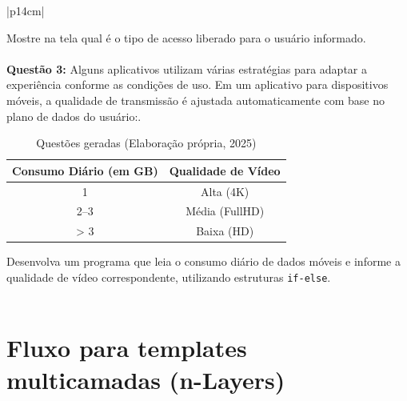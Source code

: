 \begin{table}[H]
\begin{tabular}{|p{14cm}|}
\begin{minipage}{\linewidth}
    \end{minipage}

        \vspace{1em}

        Mostre na tela qual é o tipo de acesso liberado para o usuário informado.\\[1em]
        \\
        \textbf{Questão 3:} Alguns aplicativos utilizam várias estratégias para adaptar a experiência conforme as condições de uso. Em um aplicativo para dispositivos móveis, a qualidade de transmissão é ajustada automaticamente com base no plano de dados do usuário:.
        \vspace{1em}
        
    
        
        \begin{minipage}{\linewidth}
        \centering
        \begin{tabular}{|c|c|}
                \hline
                \textbf{Consumo Diário (em GB)} & \textbf{Qualidade de Vídeo} \\
                \hline
                1 & Alta (4K) \\
                \hline
                2--3 & Média (FullHD) \\
                \hline
                > 3 & Baixa (HD) \\
                \hline
        \end{tabular}

    \end{minipage}

        \vspace{1em}

        Desenvolva um programa que leia o consumo diário de dados móveis e informe a qualidade de vídeo correspondente, utilizando estruturas \texttt{if-else}.\\[1em]
        \\
      
        \hline
    \end{tabular}
    \caption{Questões geradas (Elaboração própria, 2025)}
    \label{tab:questoes-geradas}
\end{table}




  

\section{Fluxo para templates multicamadas (n-Layers)}

